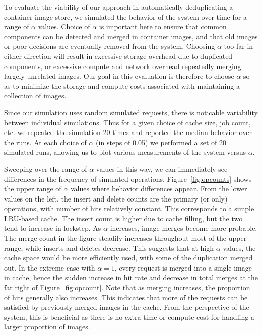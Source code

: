 \documentclass[sigconf]{acmart}
\begin{document}
To evaluate the viability of our approach in automatically deduplicating a container image store,
we simulated the behavior of the system over time for a range of $\alpha$ values.
Choice of $\alpha$ is important here to ensure that common components can be detected and merged in container images,
and that old images or poor decisions are eventually removed from the system.
Choosing $\alpha$ too far in either direction will result in excessive storage overhead due to duplicated components,
or excessive compute and network overhead repeatedly merging largely unrelated images.
Our goal in this evaluation is therefore to choose $\alpha$ so as to minimize the storage and compute costs associated with maintaining a collection of images.

Since our simulation uses random simulated requests,
there is noticable variability between individual simulations.
Thus for a given choice of cache size, job count, etc.
we repeated the simulation 20 times and reported the median behavior over the runs.
At each choice of $\alpha$ (in steps of 0.05)
we performed a set of 20 simulated runs,
allowing us to plot various measurements of the system versus $\alpha$.

Sweeping over the range of $\alpha$ values in this way,
we can immediately see differences in the frequency of simulated operations.
Figure~\ref{fig:opcounts} shows the upper range of $\alpha$ values where behavior differences appear.
From the lower values on the left,
the insert and delete counts are the primary (or only) operations,
with number of hits relatively constant.
This corresponds to a simple LRU-based cache.
The insert count is higher due to cache filling,
but the two tend to increase in lockstep.
As $\alpha$ increases,
image merges become more probable.
The merge count in the figure steadily increases throughout most of the upper range,
while inserts and deletes decrease.
This suggests that at high $\alpha$ values,
the cache space would be more efficiently used,
with some of the duplication merged out.
In the extreme case with $\alpha=1$,
every request is merged into a single image in cache,
hence the sudden increase in hit rate and decrease in total merges at the far right of Figure~\ref{fig:opcount}.
Note that as merging increases,
the proportion of hits generally also increases.
This indicates that more of the requests can be satisfied by previously merged images in the cache.
From the perspective of the system,
this is beneficial as there is no extra time or compute cost for handling a larger proportion of images.
\end{document}
